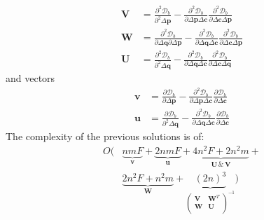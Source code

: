 \begin{equation}
    \begin{aligned}
    	\mathbf{V} & = \frac{\partial^2 \mathcal{D}_b}{\partial^2 \Delta \mathbf{p}} - \frac{\partial^2 \mathcal{D}_b}{\partial \Delta \mathbf{p} \Delta \mathbf{c}} \frac{\partial^2 \mathcal{D}_b}{\partial \Delta \mathbf{c} \Delta \mathbf{p}}
    	\\
    	\mathbf{W} & = \frac{\partial^2 \mathcal{D}_b}{\partial \Delta \mathbf{q} \partial \Delta \mathbf{p}} - \frac{\partial^2 \mathcal{D}_b}{\partial \Delta \mathbf{q} \Delta \mathbf{c}} \frac{\partial^2 \mathcal{D}_b}{\partial \Delta \mathbf{c} \Delta \mathbf{p}}
    	\\
    	\mathbf{U} & = \frac{\partial^2 \mathcal{D}_b}{\partial^2 \Delta \mathbf{q}} - \frac{\partial^2 \mathcal{D}_b}{\partial \Delta \mathbf{q} \Delta \mathbf{c}} \frac{\partial^2 \mathcal{D}_b}{\partial \Delta \mathbf{c} \Delta \mathbf{q}}
    \label{eq:auxiliar_matrixes}
    \end{aligned}
\end{equation}
and vectors
\begin{equation}
    \begin{aligned}
    	\mathbf{v} & = \frac{\partial \mathcal{D}_b}{\partial \Delta \mathbf{p}} - \frac{\partial^2 \mathcal{D}_b}{\partial \Delta \mathbf{p} \Delta \mathbf{c}} \frac{\partial \mathcal{D}_b}{\partial \Delta \mathbf{c}}
    	\\
    	\mathbf{u} & = \frac{\partial \mathcal{D}_b}{\partial^2 \Delta \mathbf{q}} - \frac{\partial^2 \mathcal{D}_b}{\partial \Delta \mathbf{q} \Delta \mathbf{c}} \frac{\partial \mathcal{D}_b}{\partial \Delta \mathbf{c}}
    \label{eq:auxiliar_matrixes}
    \end{aligned}
\end{equation}
The complexity of the previous solutions is of:
\begin{equation}
    \begin{aligned}
        O( &
        \underbrace{nmF}_{\mathbf{v}}
        +
        \underbrace{2nmF}_{\mathbf{u}}
        +
        \underbrace{4n^2F + 2n^2m}_{\mathbf{U} \, \& \, \mathbf{V}}
        +
        \\
        &
        \underbrace{2n^2F + n^2m}_{\mathbf{W}}
        +
        \underbrace{(2n)^3}_{
        \begin{pmatrix}
            \mathbf{V} & \mathbf{W}^T
            \\
            \mathbf{W} & \mathbf{U}
            \\
        \end{pmatrix}^{-1}}
        )
    \label{eq:complexity_sim_bidirectional2_newton}
    \end{aligned}
\end{equation}
